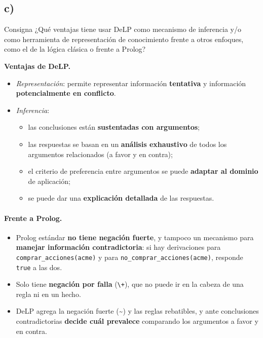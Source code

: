 \documentclass[11pt,a4paper]{article}
\newcommand{\nf}{\textasciitilde}                 %
\begin{document}
\subsection{c)}

\begin{enunciado}{Consigna}
¿Qué ventajas tiene usar DeLP como mecanismo de inferencia y/o como herramienta de representación de conocimiento frente a otros enfoques, como el de la lógica clásica o frente a Prolog?
\end{enunciado}

\medskip\noindent\textbf{Ventajas de DeLP.}
\begin{itemize}
  \item \textit{Representación}: permite representar información \textbf{tentativa} y información \textbf{potencialmente en conflicto}.
  \item \textit{Inferencia}:
  \begin{itemize}
    \item las conclusiones están \textbf{sustentadas con argumentos};
    \item las respuestas se basan en un \textbf{análisis exhaustivo} de todos los argumentos relacionados (a favor y en contra);
    \item el criterio de preferencia entre argumentos se puede \textbf{adaptar al dominio} de aplicación;
    \item se puede dar una \textbf{explicación detallada} de las respuestas.
  \end{itemize}
\end{itemize}

\paragraph{Frente a Prolog.}
\begin{itemize}
  \item Prolog estándar \textbf{no tiene negación fuerte}, y tampoco un mecanismo para \textbf{manejar información contradictoria}: si hay derivaciones para \texttt{comprar\_acciones(acme)} y para \texttt{no\_comprar\_acciones(acme)}, responde \texttt{true} a las dos.
  \item Solo tiene \textbf{negación por falla} (\texttt{\textbackslash+}), que no puede ir en la cabeza de una regla ni en un hecho.
  \item DeLP agrega la negación fuerte (\nf) y las reglas rebatibles, y ante conclusiones contradictorias \textbf{decide cuál prevalece} comparando los argumentos a favor y en contra.
\end{itemize}
\end{document}

